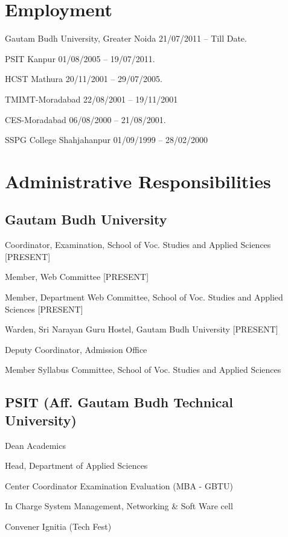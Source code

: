 \documentclass[letterpaper]{article}
\renewenvironment{itemize}{
  \begin{list}{}{
    \setlength{\leftmargin}{1.5em}
  }
}{
  \end{list}
}
\begin{document}
\section*{Employment}

\begin{itemize}
\item Gautam Budh University,	Greater Noida  21/07/2011 -- Till Date.
\item PSIT Kanpur 01/08/2005 -- 19/07/2011.
\item HCST Mathura 20/11/2001	-- 29/07/2005.
\item TMIMT-Moradabad 22/08/2001 -- 19/11/2001
\item CES-Moradabad	06/08/2000 -- 21/08/2001.
\item SSPG College Shahjahanpur 01/09/1999 --	28/02/2000
\end{itemize}

\section*{Administrative Responsibilities}
\subsection*{Gautam Budh University}
\begin{itemize}
\item Coordinator, Examination, School of Voc. Studies and Applied Sciences [PRESENT]
\item Member, Web Committee [PRESENT]
\item Member, Department Web Committee, School of Voc. Studies and Applied Sciences  [PRESENT]
\item Warden, Sri Narayan Guru Hostel, Gautam Budh University [PRESENT]
\item Deputy Coordinator, Admission Office 
\item Member Syllabus Committee, School of Voc. Studies and Applied Sciences 

\end{itemize}

\subsection*{PSIT (Aff. Gautam Budh Technical University)}
\begin{itemize}
\item Dean Academics
\item Head, Department of Applied Sciences
\item Center Coordinator Examination Evaluation (MBA - GBTU)
\item In Charge System Management, Networking \& Soft Ware cell
\item Convener Ignitia (Tech Fest)
\end{itemize}
\end{document}
